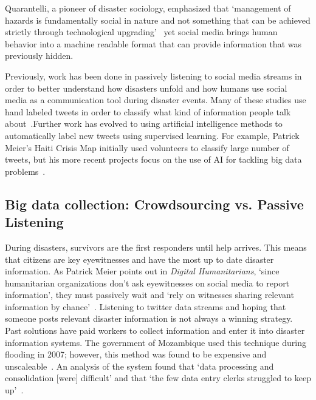 Quarantelli, a pioneer of disaster sociology, emphasized that  `management of
hazards is fundamentally social in nature and not something that can be achieved
strictly through technological
upgrading'~\cite{tierneyFacingUnexpectedDisaster2001} yet social media brings
human behavior into a machine readable format that can provide
information that was previously hidden.

Previously, work has been done in passively listening to social media streams in order
to better understand how disasters unfold and how humans use social media as a
communication tool during disaster events. Many of these studies use hand
labeled tweets in order to classify what kind of information people talk
about~\cite{alamTwitterTaleThree2018}.Further work has evolved to using
artificial intelligence methods to automatically label new tweets using
supervised learning. For example, Patrick Meier's Haiti Crisis Map initially
used volunteers to classify large number of tweets, but his more recent projects
focus on the use of AI for tackling big data
problems~\cite{meierDigitalHumanitariansHow2015}.

\subsection{Big data collection: Crowdsourcing vs. Passive Listening} 
During disasters, survivors are the first responders until help arrives. This
means that citizens are key eyewitnesses and have the most up to date
disaster information.
As Patrick Meier points out in \textit{Digital Humanitarians}, `since
humanitarian organizations don't ask eyewitnesses on social media to report
information', they must passively wait and `rely on witnesses sharing relevant
information by chance'~\cite{meierDigitalHumanitariansHow2015}. Listening to
twitter data streams and hoping that someone posts relevant disaster information
is not always a winning strategy. Past solutions have paid
workers to collect information and enter it into disaster information
systems. The government of Mozambique used this technique during flooding in
2007; however, this method was found to be expensive and
unscaleable~\cite{aminDataNaturalDisasters2008}. An analysis of the system found
that `data processing and consolidation [were] difficult' and that `the few data
entry clerks struggled to keep up'~\cite{aminDataNaturalDisasters2008}.

